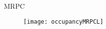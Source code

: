 \documentclass[11pt]{beamer}
\begin{document}

\begin{frame}{MRPC}
  \begin{figure}
    \texttt{[image: occupancyMRPCL]}
  \end{figure}
\end{frame}

\end{document}
